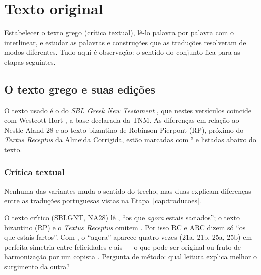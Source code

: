 \chapter{Texto original}\label{cap:original}

\begin{objetivo}
Estabelecer o texto grego (crítica textual), lê-lo palavra por palavra com o
interlinear, e estudar as palavras e construções que as traduções resolveram
de modos diferentes. Tudo aqui é observação: o sentido do conjunto fica para
as etapas seguintes.
\end{objetivo}

\section{O texto grego e suas edições}

O texto usado é o do \emph{SBL Greek New Testament} \parencite{sblgnt2010},
que nestes versículos coincide com Westcott-Hort \parencite{westcotthort1881},
a base declarada da TNM. As diferenças em relação ao Nestle-Aland 28
\parencite{na28} e ao texto bizantino de Robinson-Pierpont (RP), próximo do
\emph{Textus Receptus} da Almeida Corrigida, estão marcadas com
{\color{rubrica}°} e listadas abaixo do texto.


\subsection{Crítica textual}

Nenhuma das variantes muda o sentido do trecho, mas duas explicam diferenças
entre as traduções portuguesas vistas na Etapa~\ref{cap:traducoes}.

\begin{variante}[\rb{Lc 6:25a} — \gr{νῦν}]
O texto crítico (SBLGNT, NA28) lê ,
\enquote{os que \emph{agora} estais saciados}; o texto bizantino (RP) e o
\emph{Textus Receptus} omitem . Por isso RC e ARC dizem só
\enquote{os que estais fartos}. Com , o \enquote{agora} aparece quatro
vezes (21a, 21b, 25a, 25b) em perfeita simetria entre felicidades e ais — o
que pode ser original ou fruto de harmonização por um copista
\parencite[cf.][]{metzger1994}. Pergunta de método: qual leitura explica melhor
o surgimento da outra?
\end{variante}

